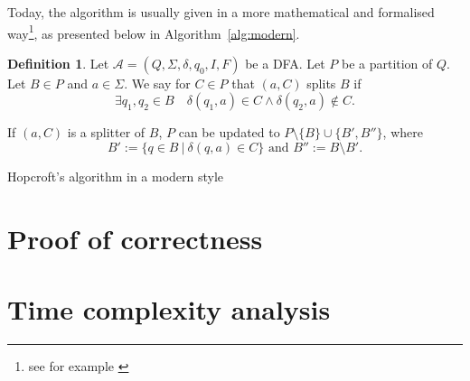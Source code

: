 \documentclass[12pt, a4 paper]{article}
\theoremstyle{definition}
\newtheorem{definition}{Definition}
\begin{document}
Today, the algorithm is usually given in a more mathematical and formalised way\footnote{see for example \cite{esparza2023automata}}, as presented below in Algorithm~\ref{alg:modern}.

\begin{definition}
    Let $\mathcal{A} = (Q, \Sigma, \delta, q_0, I, F)$ be a DFA. Let $P$ be a partition of $Q$. Let $B \in P$ and $a \in \Sigma$. We say for $C \in P$ that
    $(a, C)$ splits $B$ if $$\exists q_1, q_2 \in B \quad \delta(q_1, a) \in C \land \delta(q_2, a) \notin C.$$
\end{definition}

If $(a, C)$ is a splitter of $B$, $P$ can be updated to $P \setminus \{B\} \cup \{B', B''\}$, where $$B' := \{q \in B \ | \ \delta(q, a) \in C\} \text{ and } B'' := B \setminus B'.$$

\begin{algorithm}[H]
\SetAlgoLined
\caption{Hopcroft's algorithm in a modern style}
\label{alg:modern}

\end{algorithm}

\section{Proof of correctness}
\section{Time complexity analysis}
\end{document}
